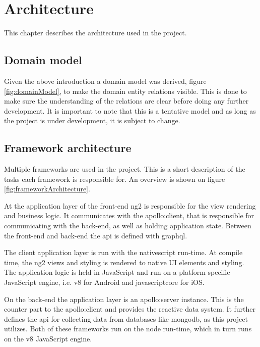 \chapter{Architecture}
This chapter describes the architecture used in the project.

\section{Domain model}
Given the above introduction a domain model was derived, figure \ref{fig:domainModel}, to make the domain entity relations visible.
This is done to make sure the understanding of the relations are clear before doing any further development.
It is important to note that this is a tentative model and as long as the project is under development, it is subject to change.


\section{Framework architecture}
Multiple frameworks are used in the project. 
This is a short description of the tasks each framework is responsible for. 
An overview is shown on figure \ref{fig:frameworkArchitecture}.

At the application layer of the front-end \gls{ng2} is responsible for the view rendering and business logic. 
It communicates with the \gls{apollo:client}, that is responsible for communicating with the back-end, as well as holding application state. 
Between the front-end and back-end the \gls{api} is defined with \gls{graphql}.

The client application layer is run with the \gls{nativescript} run-time. 
At compile time, the \gls{ng2} views and styling is rendered to native UI elements and styling. 
The application logic is held in JavaScript and run on a platform specific JavaScript engine, i.e. \gls{v8} for Android and \gls{javascriptcore} for iOS.

On the back-end the application layer is an \gls{apollo:server} instance. 
This is the counter part to the \gls{apollo:client} and provides the reactive data system. 
It further defines the \gls{api} for collecting data from databases like \gls{mongodb}, as this project utilizes.
Both of these frameworks run on the \gls{node} run-time, which in turn runs on the \gls{v8} JavaScript engine.


